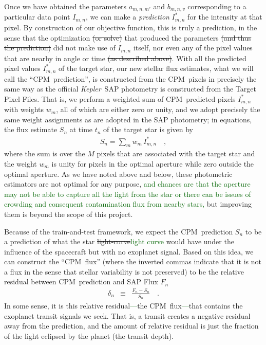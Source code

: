 \documentclass[12pt, preprint]{aastex}
\newcommand{\project}[1]{\textsl{#1}}
\newcommand{\Kepler}{\project{Kepler}}
\newcommand{\name}{CPM}
\newcommand{\revise}[1]{\textcolor{darkgreen}{#1}}
\newcommand{\remove}[1]{\sout{#1}}
\begin{document}
Once we have obtained the parameters $a_{m,n,m'}$ and $b_{m,n,v}$ corresponding to a particular data point $I_{m,n}$,
  we can make a \emph{prediction} $I^{\ast}_{m,n}$ for the intensity at that pixel.
By construction of our objective function, this is truly a prediction,
  in the sense that the optimization \remove{(or solve)} that produced the parameters
  \remove{(and thus the prediction)}
  did not make use of $I_{m,n}$ itself,
  nor even any of the pixel values that are nearby in angle or time
  \remove{(as described above)}.
  With all the predicted pixel values $I^{\ast}_{m,n}$ of the target star,  
  our new stellar flux estimates,
  what we will call the ``\name\ prediction'',
  is constructed from the \name\ pixels
  in precisely the same way as the official \Kepler\ SAP photometry
  is constructed from the Target Pixel Files.
That is, we perform a weighted sum of \name\ predicted pixels $I^{\ast}_{m,n}$ with weights $w_m$,
  all of which are either zero or unity,
  and we adopt precisely the same weight assignments as are adopted in the SAP photometry;
  in equations, the flux estimate $S_n$ at time $t_n$ of the target star is given by
\begin{eqnarray}
S_n = \sum_m w_m\,I^{\ast}_{m,n}
\quad ,
\end{eqnarray}
where the sum is over the $M$ pixels that are associated with the target star and the weight $w_m$ is unity for pixels in the optimal
aperture while zero outside the optimal aperture.
As we have noted above and below, these photometric estimators are not optimal for any purpose, \revise{and chances are that the aperture may not be able to capture all the light from the star or there can be issues of crowding and consequent contamination flux from nearby stars,}
  but improving them is beyond the scope of this project.

Because of the train-and-test framework,  we expect the \name\ prediction $S_{n}$ to be a prediction of what the star \remove{light-curve}\revise{light curve} would have under the influence of the spacecraft but with no exoplanet signal. 
Based on this idea, 
  we can construct the ``\name\ flux'' 
  (where the inverted commas indicate that it is not a flux in the sense that stellar variability is not preserved) 
  to be the relative residual between \name\ prediction and SAP Flux $F_{n}$
\begin{eqnarray}
\delta_{n}&\equiv&\frac{F_{n} - S_{n}}{S_{n}}
\quad .
\end{eqnarray} 
In some sense, it is this relative residual\revise{---}the \name\ flux\revise{---}that contains the exoplanet transit signals we seek. 
That is, a transit creates a negative residual away from the prediction, 
  and the amount of relative residual is just the fraction of the light eclipsed by the planet (the transit depth). 
\end{document}
